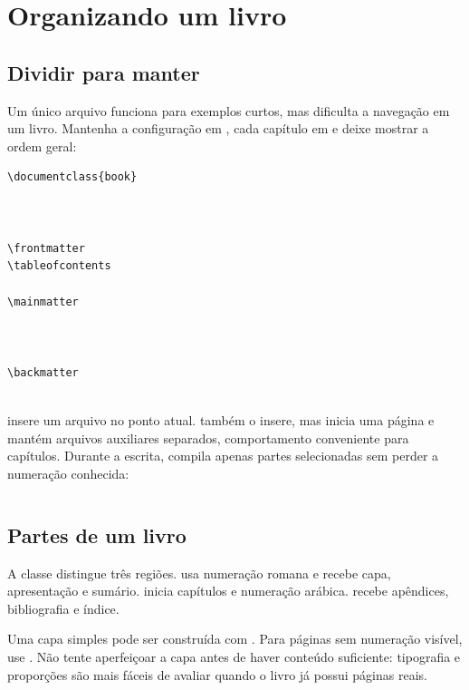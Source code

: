 \chapter{Organizando um livro}
\label{chap:organizacao}

\section{Dividir para manter}

Um único arquivo funciona para exemplos curtos, mas dificulta a navegação em um
livro. Mantenha a configuração em , cada capítulo em
 e deixe  mostrar a ordem geral:

\begin{lstlisting}[language=LaTeXBook]
\documentclass{book}



\frontmatter
\tableofcontents

\mainmatter



\backmatter


\end{lstlisting}

 insere um arquivo no ponto atual.  também o
insere, mas inicia uma página e mantém arquivos auxiliares separados, comportamento
conveniente para capítulos. Durante a escrita,  compila
apenas partes selecionadas sem perder a numeração conhecida:

\begin{lstlisting}[language=LaTeXBook]

\end{lstlisting}

\section{Partes de um livro}

A classe  distingue três regiões.  usa
numeração romana e recebe capa, apresentação e sumário. 
inicia capítulos e numeração arábica.  recebe apêndices,
bibliografia e índice.

Uma capa simples pode ser construída com . Para páginas sem
numeração visível, use . Não tente aperfeiçoar a
capa antes de haver conteúdo suficiente: tipografia e proporções são mais fáceis
de avaliar quando o livro já possui páginas reais.

